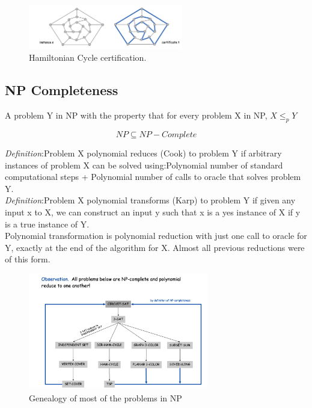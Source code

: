 \documentclass[11pt]{article}
\begin{document}
\begin{figure}[H]
		\centering
		\includegraphics[width=0.6\textwidth ]{ham}
		\caption{Hamiltonian Cycle certification.}
\end{figure}

\clearpage

\subsection{NP Completeness}

 A problem Y in NP with the property that for every problem X in NP, $X \leq _{p} Y$
 
 \[NP \subseteq NP-Complete\]

\emph{Definition}:Problem X polynomial reduces (Cook) to problem Y if arbitrary instances of problem X can be solved using:Polynomial number of standard computational steps + Polynomial number of calls to oracle that solves problem Y.\\

\emph{Definition}:Problem X polynomial transforms (Karp) to problem Y if given any input x to X, we can construct an input y such that x is a yes instance of X if y is a true instance of Y.\\

Polynomial transformation is polynomial reduction with just one call to oracle for Y, exactly at the end of the algorithm for X. Almost all previous reductions were of this form.


\begin{figure}[H]
		\centering
		\includegraphics[width=0.7\textwidth ]{npComplete}
		\caption{Genealogy of most of the problems in NP}
\end{figure}
\end{document}
